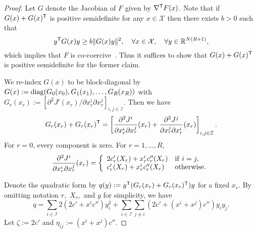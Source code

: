 \documentclass[letterpaper, 10 pt, conference]{ieeeconf}  %
\newcommand{\mc}[1]{\mathcal{#1}}
\newcommand{\bR}{\mathbb{R}}
\begin{document}
\begin{proof}
Let $G$ denote the Jacobian of $F$ given by $\nabla^{\sf T} F(x)$.
Note that if $G(x)+G(x)^{\sf T}$ is positive semidefinite for any $x\in\mc{X}$ then there exists $b>0$ such that
\[
 y^{\sf T}G(x)y \geq b\|G(x)y\|^2,\quad \forall x\in\mc{X},\quad\forall y\in\bR^{N(R+1)},
\]
which implies that $F$ is co-coercive~\cite[Prop. 2.9.25 (a)]{Facchinei2003Finite}.
Thus it suffices to show that $G(x)+G(x)^{\sf T}$ is positive semidefinite for the former claim.

We re-index $G(x)$ to be block-diagonal by $G(x):={\rm diag}(G_0(x_0),G_1(x_1),\ldots,G_R(x_R))$ with
$G_r(x_r):=[\partial^2 J^i(x_r)/\partial x^i_r \partial x^j_r]_{i,j \in \mc{I}}.$
Then we have
\[
 G_r(x_r)+G_r(x_r)^{\sf T}=\left[\dfrac{\partial^2 J^i}{\partial x^i_r \partial x^j_r}(x_r) + \dfrac{\partial^2 J^j}{\partial x^j_r \partial x^i_r}(x_r)\right]_{i,j \in \mc{I}}.
\]
For $r=0$, every component is zero.
For $r=1,\ldots,R$,
\[
 \dfrac{\partial^2 J^i}{\partial x^i_r \partial x^j_r}(x_r) = \left\{
 \begin{array}{ll}
 2c'_r(X_r)+x^i_rc''_r(X_r) & {\rm if}\ i=j,\\
 c'_r(X_r)+x^i_rc''_r(X_r) & {\rm otherwise}.
 \end{array}
 \right.
\]

Denote the quadratic form by $q(y):=y^{\sf T}(G_r(x_r)+G_r(x_r)^{\sf T})y$
for a fixed $x_r$.
By omitting notation $r,$ $X_r,$ and $y$ for simplicity, we have
\[
 q = \sum_{i \in \mc{I}}2(2c'+x^ic'')y^2_i + \sum_{i \in \mc{I}} \sum_{j\neq i} (2c'+(x^i+x^j)c'')y_iy_j.
\]
Let $\zeta:=2c'$ and $\eta_{ij}:=(x^i+x^j)c''$.


\end{proof}
\end{document}
